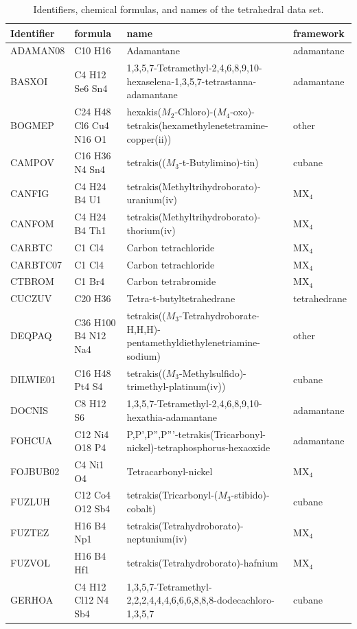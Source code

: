 \documentclass[preprint]{iucr}              %
\begin{document}
\begin{landscape}
\begin{table}
\caption{Identifiers, chemical formulas, and names of the
tetrahedral data set.}\label{names1} \tiny
\begin{tabular}{llll}
Identifier & formula & name & framework\\
\hline
ADAMAN08 & C10 H16 & Adamantane & adamantane \\
BASXOI & C4 H12 Se6 Sn4 & 1,3,5,7-Tetramethyl-2,4,6,8,9,10-hexaselena-1,3,5,7-tetrastanna-adamantane & adamantane \\
BOGMEP & C24 H48 Cl6 Cu4 N16 O1 & hexakis($M_2$-Chloro)-($M_4$-oxo)-tetrakis(hexamethylenetetramine-copper(ii)) & other \\
CAMPOV & C16 H36 N4 Sn4 & tetrakis(($M_3$-t-Butylimino)-tin) & cubane\\
CANFIG & C4 H24 B4 U1 & tetrakis(Methyltrihydroborato)-uranium(iv) & MX$_4$\\
CANFOM & C4 H24 B4 Th1 & tetrakis(Methyltrihydroborato)-thorium(iv) & MX$_4$\\
CARBTC & C1 Cl4 & Carbon tetrachloride & MX$_4$\\
CARBTC07 & C1 Cl4 & Carbon tetrachloride & MX$_4$\\
CTBROM & C1 Br4 & Carbon tetrabromide & MX$_4$\\
CUCZUV & C20 H36 & Tetra-t-butyltetrahedrane & tetrahedrane\\
DEQPAQ & C36 H100 B4 N12 Na4 & tetrakis(($M_3$-Tetrahydroborate-H,H,H)-pentamethyldiethylenetriamine-sodium) & other\\
DILWIE01 & C16 H48 Pt4 S4 & tetrakis(($M_3$-Methylsulfido)-trimethyl-platinum(iv)) & cubane\\
DOCNIS & C8 H12 S6 & 1,3,5,7-Tetramethyl-2,4,6,8,9,10-hexathia-adamantane & adamantane\\
FOHCUA & C12 Ni4 O18 P4 & P,P',P'',P'''-tetrakis(Tricarbonyl-nickel)-tetraphosphorus-hexaoxide & adamantane\\
FOJBUB02 & C4 Ni1 O4 & Tetracarbonyl-nickel & MX$_4$\\
FUZLUH & C12 Co4 O12 Sb4 & tetrakis(Tricarbonyl-($M_3$-stibido)-cobalt) & cubane\\
FUZTEZ & H16 B4 Np1 & tetrakis(Tetrahydroborato)-neptunium(iv) & MX$_4$\\
FUZVOL & H16 B4 Hf1 & tetrakis(Tetrahydroborato)-hafnium & MX$_4$\\
GERHOA & C4 H12 Cl12 N4 Sb4 & 1,3,5,7-Tetramethyl-2,2,2,4,4,4,6,6,6,8,8,8-dodecachloro-1,3,5,7 & cubane\\

\end{tabular}
\end{table}
\end{landscape}
\end{document}
